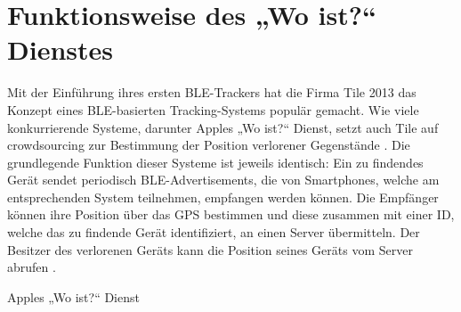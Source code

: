 \section{Funktionsweise des „Wo ist?“ Dienstes}
\label{sec:Funktionsweise}

Mit der Einführung ihres ersten \ac{BLE}-Trackers hat die Firma Tile 2013 das Konzept eines \ac{BLE}-basierten Tracking-Systems populär gemacht.
Wie viele konkurrierende Systeme, darunter Apples „Wo ist?“ Dienst, setzt auch Tile auf crowdsourcing zur Bestimmung der Position verlorener Gegenstände \cite{Weller_BLE_Finders}.
Die grundlegende Funktion dieser Systeme ist jeweils identisch: Ein zu findendes Gerät sendet periodisch \ac{BLE}-Advertisements, die von Smartphones, welche am entsprechenden System teilnehmen, empfangen werden können.
Die Empfänger können ihre Position über das \ac{GPS} bestimmen und diese zusammen mit einer ID, welche das zu findende Gerät identifiziert, an einen Server übermitteln.
Der Besitzer des verlorenen Geräts kann die Position seines Geräts vom Server abrufen \cite{Garg_Secure_Tracker}.



Apples „Wo ist?“ Dienst 